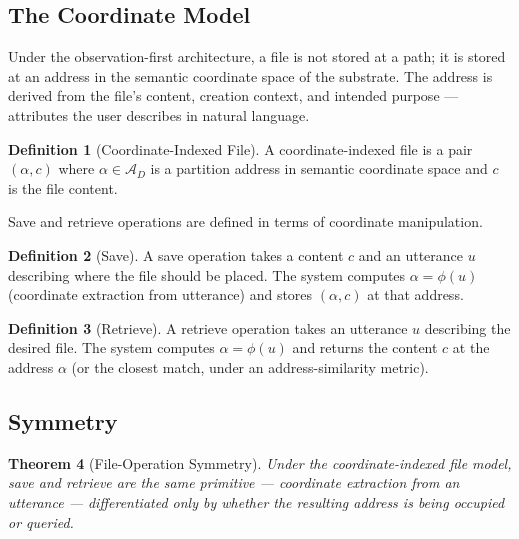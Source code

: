 \documentclass[11pt,twocolumn,a4paper]{article}
\newtheorem{theorem}{Theorem}[section]
\theoremstyle{definition}
\newtheorem{definition}[theorem]{Definition}
\theoremstyle{remark}
\newcommand{\Ac}{\mathcal{A}}
\begin{document}
\subsection{The Coordinate Model}

Under the observation-first architecture, a file is not stored at a path; it is stored at an address in the semantic coordinate space of the substrate. The address is derived from the file's content, creation context, and intended purpose --- attributes the user describes in natural language.

\begin{definition}[Coordinate-Indexed File]
\label{def:cifile}
A coordinate-indexed file is a pair $(\alpha, c)$ where $\alpha \in \Ac_D$ is a partition address in semantic coordinate space and $c$ is the file content.
\end{definition}

Save and retrieve operations are defined in terms of coordinate manipulation.

\begin{definition}[Save]
A save operation takes a content $c$ and an utterance $u$ describing where the file should be placed. The system computes $\alpha = \phi(u)$ (coordinate extraction from utterance) and stores $(\alpha, c)$ at that address.
\end{definition}

\begin{definition}[Retrieve]
A retrieve operation takes an utterance $u$ describing the desired file. The system computes $\alpha = \phi(u)$ and returns the content $c$ at the address $\alpha$ (or the closest match, under an address-similarity metric).
\end{definition}

\subsection{Symmetry}

\begin{theorem}[File-Operation Symmetry]
\label{thm:file-sym}
Under the coordinate-indexed file model, save and retrieve are the same primitive --- coordinate extraction from an utterance --- differentiated only by whether the resulting address is being occupied or queried.
\end{theorem}
\end{document}
